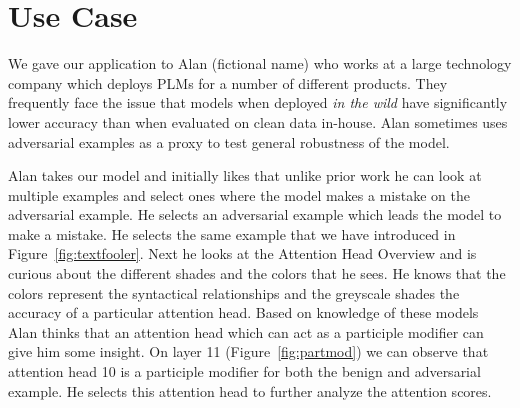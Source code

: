 \documentclass[journal]{vgtc}                %
\begin{document}

\section{Use Case}

We gave our application to Alan (fictional name) who works at a large technology company which deploys PLMs for a number of different products. They frequently face the issue that models when deployed \textit{in the wild} have significantly lower accuracy than when evaluated on clean data in-house. Alan sometimes uses adversarial examples as a proxy to test general robustness of the model. 

Alan takes our model and initially likes that unlike prior work he can look at multiple examples and select ones where the model makes a mistake on the adversarial example. He selects an adversarial example which leads the model to make a mistake. He selects the same example that we have introduced in Figure~\ref{fig:textfooler}. Next he looks at the Attention Head Overview and is curious about the different shades and the colors that he sees. He knows that the colors represent the syntactical relationships and the greyscale shades the accuracy of a particular attention head. Based on knowledge of these models Alan thinks that an attention head which can act as a participle modifier can give him some insight. On layer 11 (Figure~\ref{fig:partmod}) we can observe that attention head 10 is a participle modifier for both the benign and adversarial example. He selects this attention head to further analyze the attention scores.
\end{document}
